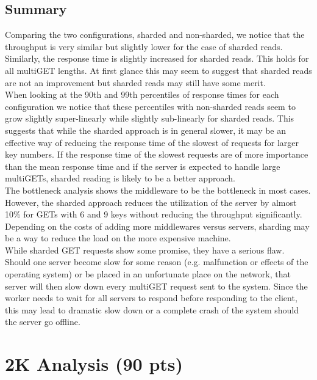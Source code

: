 \documentclass[11pt,a4paper]{article}
\begin{document}
\subsection{Summary}

Comparing the two configurations, sharded and non-sharded, we notice that the throughput is very similar but slightly lower for the case of sharded reads. Similarly, the response time is slightly increased for sharded reads. This holds for all multiGET lengths. At first glance this may seem to suggest that sharded reads are not an improvement but sharded reads may still have some merit.\\

When looking at the 90th and 99th percentiles of response times for each configuration we notice that these percentiles with non-sharded reads seem to grow slightly super-linearly while slightly sub-linearly for sharded reads. This suggests that while the sharded approach is in general slower, it may be an effective way of reducing the response time of the slowest of requests for larger key numbers. If the response time of the slowest requests are of more importance than the mean response time and if the server is expected to handle large multiGETs, sharded reading is likely to be a better approach.\\

The bottleneck analysis shows the middleware to be the bottleneck in most cases. However, the sharded approach reduces the utilization of the server by almost 10\% for GETs with 6 and 9 keys without reducing the throughput significantly. Depending on the costs of adding more middlewares versus servers, sharding may be a way to reduce the load on the more expensive machine.\\

While sharded GET requests show some promise, they have a serious flaw. Should one server become slow for some reason (e.g. malfunction or effects of the operating system) or be placed in an unfortunate place on the network, that server will then slow down every multiGET request sent to the system. Since the worker needs to wait for all servers to respond before responding to the client, this may lead to dramatic slow down or a complete crash of the system should the server go offline. 


\newpage

\section{2K Analysis (90 pts)}
\end{document}
